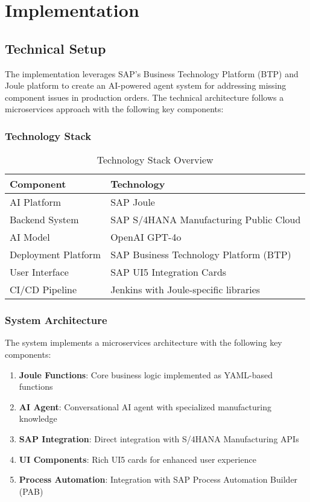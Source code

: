 \chapter{Implementation}
\label{chap:Implementation}

\section{Technical Setup}

The implementation leverages SAP's Business Technology Platform (BTP) and Joule platform to create an AI-powered agent system for addressing missing component issues in production orders. The technical architecture follows a microservices approach with the following key components:

\subsection{Technology Stack}

\begin{table}[h]
\centering
\begin{tabular}{@{}ll@{}}
\toprule
\textbf{Component} & \textbf{Technology} \\
\midrule
AI Platform & SAP Joule \\
Backend System & SAP S/4HANA Manufacturing Public Cloud \\
AI Model & OpenAI GPT-4o \\
Deployment Platform & SAP Business Technology Platform (BTP) \\
User Interface & SAP UI5 Integration Cards \\
CI/CD Pipeline & Jenkins with Joule-specific libraries \\
\bottomrule
\end{tabular}
\caption{Technology Stack Overview}
\end{table}

\subsection{System Architecture}

The system implements a microservices architecture with the following key components:

\begin{enumerate}
    \item \textbf{Joule Functions}: Core business logic implemented as YAML-based functions
    \item \textbf{AI Agent}: Conversational AI agent with specialized manufacturing knowledge
    \item \textbf{SAP Integration}: Direct integration with S/4HANA Manufacturing APIs
    \item \textbf{UI Components}: Rich UI5 cards for enhanced user experience
    \item \textbf{Process Automation}: Integration with SAP Process Automation Builder (PAB)
\end{enumerate}

